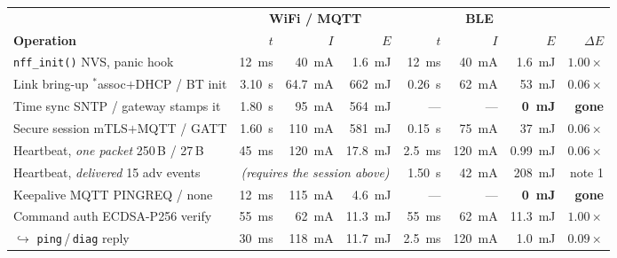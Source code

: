 \documentclass[10pt,a4paper]{article}
\newcommand{\good}[1]{\textcolor{ok}{\textbf{#1}}}
\newcommand{\meas}{\textcolor{ok}{$^{\ast}$}}
\begin{document}
\begin{center}
\small
\begin{tabular}{@{}lrrrrrrr@{}}
\toprule
& \multicolumn{3}{c}{\textbf{WiFi / MQTT}} & \multicolumn{3}{c}{\textbf{BLE}} & \\
\cmidrule(lr){2-4}\cmidrule(lr){5-7}
\textbf{Operation} & $t$ & $I$ & $E$ & $t$ & $I$ & $E$ & \textbf{$\Delta E$} \\
\midrule
\texttt{nff\_init()} \footnotesize NVS, panic hook & \SI{12}{\milli\second} & \SI{40}{\milli\ampere} & \SI{1.6}{\milli\joule} & \SI{12}{\milli\second} & \SI{40}{\milli\ampere} & \SI{1.6}{\milli\joule} & $1.00\times$ \\
\addlinespace[1mm]
Link bring-up \meas \footnotesize assoc$+$DHCP / BT init & \SI{3.10}{\second} & \SI{64.7}{\milli\ampere} & \SI{662}{\milli\joule} & \SI{0.26}{\second} & \SI{62}{\milli\ampere} & \SI{53}{\milli\joule} & \good{$0.06\times$} \\
Time sync \footnotesize SNTP / gateway stamps it & \SI{1.80}{\second} & \SI{95}{\milli\ampere} & \SI{564}{\milli\joule} & --- & --- & \good{\SI{0}{\milli\joule}} & \good{gone} \\
Secure session \footnotesize mTLS$+$MQTT / GATT & \SI{1.60}{\second} & \SI{110}{\milli\ampere} & \SI{581}{\milli\joule} & \SI{0.15}{\second} & \SI{75}{\milli\ampere} & \SI{37}{\milli\joule} & \good{$0.06\times$} \\
\addlinespace[1mm]
Heartbeat, \emph{one packet} \footnotesize 250\,B / 27\,B & \SI{45}{\milli\second} & \SI{120}{\milli\ampere} & \SI{17.8}{\milli\joule} & \SI{2.5}{\milli\second} & \SI{120}{\milli\ampere} & \SI{0.99}{\milli\joule} & \good{$0.06\times$} \\
Heartbeat, \emph{delivered} \footnotesize 15 adv events & \multicolumn{3}{c}{\footnotesize\itshape (requires the session above)} & \SI{1.50}{\second} & \SI{42}{\milli\ampere} & \SI{208}{\milli\joule} & \footnotesize note 1 \\
Keepalive \footnotesize MQTT PINGREQ / none & \SI{12}{\milli\second} & \SI{115}{\milli\ampere} & \SI{4.6}{\milli\joule} & --- & --- & \good{\SI{0}{\milli\joule}} & \good{gone} \\
\addlinespace[1mm]
Command auth \footnotesize ECDSA-P256 verify & \SI{55}{\milli\second} & \SI{62}{\milli\ampere} & \SI{11.3}{\milli\joule} & \SI{55}{\milli\second} & \SI{62}{\milli\ampere} & \SI{11.3}{\milli\joule} & $1.00\times$ \\
\quad$\hookrightarrow$ \texttt{ping}\,/\,\texttt{diag} reply & \SI{30}{\milli\second} & \SI{118}{\milli\ampere} & \SI{11.7}{\milli\joule} & \SI{2.5}{\milli\second} & \SI{120}{\milli\ampere} & \SI{1.0}{\milli\joule} & \good{$0.09\times$} \\

\end{tabular}
\end{center}
\end{document}
